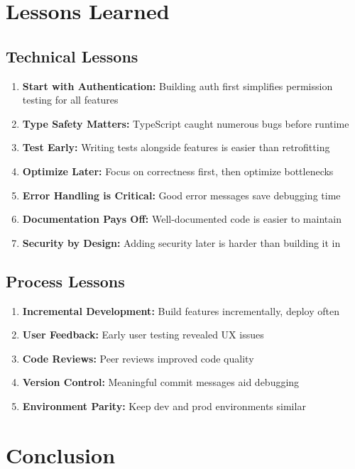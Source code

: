 \documentclass[11pt,a4paper]{article}
\begin{document}
\section{Lessons Learned}

\subsection{Technical Lessons}
\begin{enumerate}[leftmargin=*]
    \item \textbf{Start with Authentication:} Building auth first simplifies permission testing for all features
    \item \textbf{Type Safety Matters:} TypeScript caught numerous bugs before runtime
    \item \textbf{Test Early:} Writing tests alongside features is easier than retrofitting
    \item \textbf{Optimize Later:} Focus on correctness first, then optimize bottlenecks
    \item \textbf{Error Handling is Critical:} Good error messages save debugging time
    \item \textbf{Documentation Pays Off:} Well-documented code is easier to maintain
    \item \textbf{Security by Design:} Adding security later is harder than building it in
\end{enumerate}

\subsection{Process Lessons}
\begin{enumerate}[leftmargin=*]
    \item \textbf{Incremental Development:} Build features incrementally, deploy often
    \item \textbf{User Feedback:} Early user testing revealed UX issues
    \item \textbf{Code Reviews:} Peer reviews improved code quality
    \item \textbf{Version Control:} Meaningful commit messages aid debugging
    \item \textbf{Environment Parity:} Keep dev and prod environments similar
\end{enumerate}

\section{Conclusion}
\end{document}
